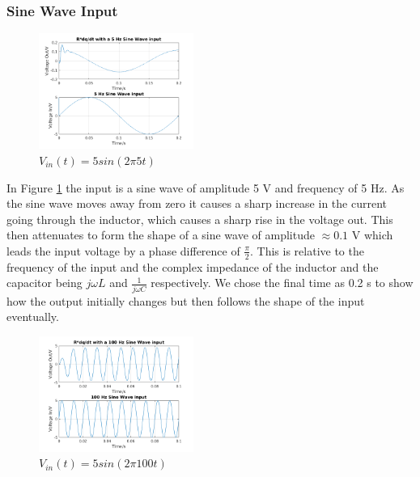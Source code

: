 \documentclass[11pt,a4paper]{article}
\begin{document}
\subsubsection{Sine Wave Input}

\begin{figure}
    \vspace{-15mm}
  		\includegraphics[width=0.45\textwidth]{Ex3_Figs/5Sine2.png}
	\vspace{-3mm}
  	\caption{$V_{in}(t)= 5sin(2 \pi 5t)$}
  	\label{fig:ex3g2}

\end{figure}

\vspace{0mm}In Figure \ref{fig:ex3g2} the input is a sine wave of amplitude 5 V and frequency of 5 Hz. As the sine wave moves away from zero it causes a sharp increase in the current going through the inductor, which causes a sharp rise in the voltage out. This then attenuates to form the shape of a sine wave of amplitude $\approx 0.1$ V which leads the input voltage by a phase difference of $\frac{\pi}{2}$. This is relative to the frequency of the input and the complex impedance of the inductor and the capacitor being $j\omega L$ and $\frac{1}{j\omega C}$ respectively. We chose the final time as 0.2 s to show how the output initially changes but then follows the shape of the input eventually.

\begin{figure}
    \vspace{-15mm}
  		\includegraphics[width=0.45\textwidth]{Ex3_Figs/100Sine.png}
	\vspace{-3mm}
  	\caption{$V_{in}(t)= 5sin(2 \pi 100t)$}
  	\label{fig:ex3g3}
\end{figure}
\end{document}
